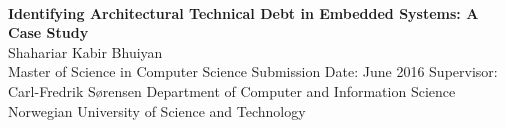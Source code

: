 
\thispagestyle{empty}
\mbox{}\\[6pc]

\begin{center}
\Huge{\textbf{Identifying Architectural Technical Debt in Embedded Systems: A Case Study}}\\[4pc]
\Large{Shahariar Kabir Bhuiyan}\\[1pc]


\noindent Master of Science in Computer Science
\linebreak
\noindent Submission Date: June 2016
\linebreak
\noindent Supervisor: Carl-Fredrik Sørensen
\linebreak
\linebreak
\noindent Department of Computer and Information Science\\
\noindent Norwegian University of Science and Technology
\end{center}

\vfill


